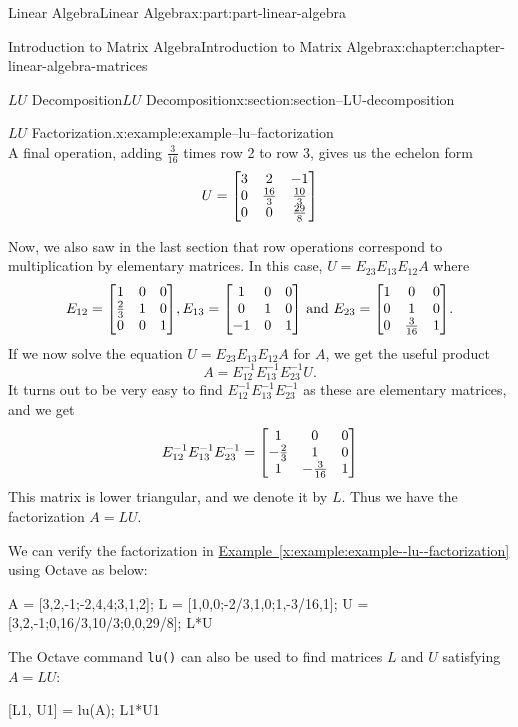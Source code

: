 \documentclass[twoside,10pt,]{book}
\newcommand{\xreffont}{\relax}
\newcommand{\mono}[1]{\texttt{#1}}
\numberwithin{equation}{part}
\begin{document}
\begin{partptx}{Linear Algebra}{}{Linear Algebra}{}{}{x:part:part-linear-algebra}
\begin{chapterptx}{Introduction to Matrix Algebra}{}{Introduction to Matrix Algebra}{}{}{x:chapter:chapter-linear-algebra-matrices}
\begin{sectionptx}{\(LU\) Decomposition}{}{\(LU\) Decomposition}{}{}{x:section:section--LU-decomposition}
\begin{example}{\(LU\) Factorization.}{x:example:example--lu--factorization}
\begin{equation*}
\end{equation*}
A final operation, adding \(\frac{3}{16}\) times row 2 to row 3, gives us the echelon form%
\begin{equation*}
U = \mqty[3 & 2 & -1 \\ 0 & \frac{16}{3} & \frac{10}{3} \\ 0 & 0 & \frac{29}{8}]
\end{equation*}
%
\par
Now, we also saw in the last section that row operations correspond to multiplication by elementary matrices. In this case, \(U = E_{23}E_{13}E_{12}A\) where%
\begin{equation*}
E_{12} = \mqty[1 & 0 & 0 \\ \frac{2}{3}& 1 & 0 \\ 0 & 0 & 1], E_{13} = \mqty[1 & 0 & 0 \\ 0 & 1 & 0 \\ -1 & 0 & 1]\text{ and }E_{23} = \mqty[1 & 0 & 0 \\ 0 & 1 & 0 \\ 0 & \frac{3}{16} & 1].
\end{equation*}
If we now solve the equation \(U = E_{23}E_{13}E_{12}A\) for \(A\), we get the useful product%
\begin{equation*}
A = E_{12}^{-1}E_{13}^{-1}E_{23}^{-1}U.
\end{equation*}
It turns out to be very easy to find \(E_{12}^{-1}E_{13}^{-1}E_{23}^{-1}\) as these are elementary matrices, and we get%
\begin{equation*}
E_{12}^{-1}E_{13}^{-1}E_{23}^{-1} = \mqty[1 & 0 & 0 \\ -\frac{2}{3} & 1 & 0 \\ 1 & -\frac{3}{16} & 1]
\end{equation*}
This matrix is lower triangular, and we denote it by \(L\). Thus we have the factorization \(A = LU\).%
\end{example}
We can verify the factorization in \hyperref[x:example:example--lu--factorization]{Example~{\xreffont\ref{x:example:example--lu--factorization}}} using Octave as below: \begin{sageinput}
A = [3,2,-1;-2,4,4;3,1,2];
L = [1,0,0;-2/3,1,0;1,-3/16,1];
U = [3,2,-1;0,16/3,10/3;0,0,29/8];
L*U
\end{sageinput}
 The Octave command \mono{lu()} can also be used to find matrices \(L\) and \(U\) satisfying \(A = LU\): \begin{sageinput}
[L1, U1] = lu(A);
L1*U1
\end{sageinput}

\end{sectionptx}
\end{chapterptx}
\end{partptx}
\end{document}
